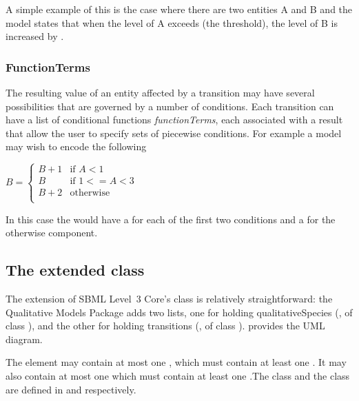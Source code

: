 A simple example of this is the case where there are two entities A and B and the model states that when the level of A exceeds  (the threshold), the level of B is increased by . 




\smallskip
\subsubsection{FunctionTerms}

The resulting value of an entity affected by a transition may have several possibilities that are governed by a number of conditions. Each transition can have a list of conditional functions \emph{functionTerms}, each associated with a result that allow the user to specify sets of piecewise conditions. For example a model may wish to encode the following
\smallskip
\begin{center}
$B = \left\{ \begin{array}{ll}
      B+1 & \mbox{if $A < 1$} \\
      B & \mbox{if $1 <= A < 3$} \\
     B + 2 & \mbox{otherwise}  \\
     \end{array}
\right.
$
\end{center}

\smallskip
In this case the \Transition would have a \FunctionTerm for each of the first two conditions and a \DefaultTerm for the otherwise component.





\subsection{The extended  class}
\label{model-class}

The extension of SBML Level~3 Core's \Model class is relatively
straightforward: the Qualitative Models Package adds two lists,
one for holding qualitativeSpecies (, of class
\ListOfQualitativeSpecies), and the other for holding transitions (,
of class \ListOfTransitions).   provides the UML
diagram.  

The  element may contain at most one \ListOfQualitativeSpecies, which must contain at least one \QualitativeSpecies. It may also contain at most one \ListOfTransitions which must contain at least one \Transition.The \QualitativeSpecies class and
the \Transition  class are defined in  and  respectively.

